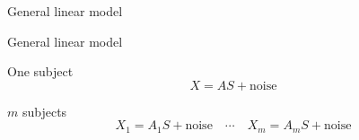 \documentclass[bigger]{beamer}
\begin{document}
\begin{frame}{General linear model}
\end{frame}

\begin{frame}{General linear model}
  \begin{block}{One subject}
    \begin{equation*}
    X = A S + \mathrm{noise} 
    \end{equation*}
  \end{block}

  \pause

  \begin{block}{$m$ subjects}
    \begin{equation*}
      X_1 = A_1 S + \mathrm{noise} \enspace \enspace \cdots \enspace \enspace X_m = A_m S + \mathrm{noise}
    \end{equation*}
  \end{block}
  \pause
  

\end{frame}
\end{document}
